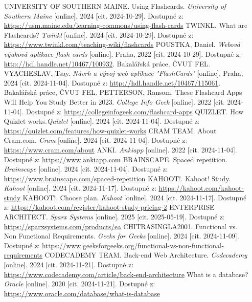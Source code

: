 \documentclass[twoside]{ctuthesis}
\begin{document}
\begin{thebibliography}{1}

UNIVERSITY OF SOUTHERN MAINE. Using Flashcards. \emph{University of Southern Maine} [online]. 2024 [cit. 2024-10-29]. Dostupné z: \url{https://usm.maine.edu/learning-commons/using-flash-cards}
TWINKL. What are Flashcards? \emph{Twinkl} [online]. 2024 [cit. 2024-10-29]. Dostupné z: \url{https://www.twinkl.com/teaching-wiki/flashcards}
POUSTKA, Daniel. \emph{Webová výuková aplikace flash cards} [online]. Praha, 2022 [cit. 2024-10-29]. Dostupné z: \url{http://hdl.handle.net/10467/100932}. Bakalářská práce, ČVUT FEL.
VYACHESLAV, Tsay. \emph{Návrh a vývoj web aplikace "FlashCards"} [online]. Praha, 2024 [cit. 2024-11-04]. Dostupné z: \url{http://hdl.handle.net/10467/115061}. Bakalářská práce, ČVUT FEL.
PETTERSON, Ransom. These Flashcard Apps Will Help You Study Better in 2023. \emph{College Info Geek} [online]. 2022 [cit. 2024-11-04]. Dostupné z: \url{https://collegeinfogeek.com/flashcard-apps}
QUIZLET. How Quizlet works.\emph{Quizlet} [online]. 2024 [cit. 2024-11-04]. Dostupné z: \url{https://quizlet.com/features/how-quizlet-works}
CRAM TEAM. About Cram.com. \emph{Cram} [online]. 2024 [cit. 2024-11-04]. Dostupné z: \url{https://www.cram.com/about}
ANKI. \emph{Ankiapp} [online]. 2022 [cit. 2024-11-04]. Dostupné z: \url{https://www.ankiapp.com}
BRAINSCAPE. Spaced repetition. \emph{Brainscape} [online]. 2024 [cit. 2024-11-04]. Dostupné z: \url{https://www.brainscape.com/spaced-repetition}
KAHOOT!. Kahoot! Study. \emph{Kahoot} [online]. 2024 [cit. 2024-11-17]. Dostupné z: \url{https://kahoot.com/kahoot-study}
KAHOOT!. Choose plan. \emph{Kahoot} [online]. 2024 [cit. 2024-11-17]. Dostupné z: \url{https://kahoot.com/register/kahoot-study-pricing-2}
ENTERPRISE ARCHITECT. \emph{Sparx Systems} [online]. 2025 [cit. 2025-05-19]. Dostupné z: \url{https://sparxsystems.com/products/ea}
CHITRASINGLA2001. Functional vs. Non Functional Requirements. \emph{Geeks for Geeks} [online]. 2024 [cit. 2024-11-09]. Dostupné z: \url{https://www.geeksforgeeks.org/functional-vs-non-functional-requirements}
CODECADEMY TEAM. Back-end Web Architecture. \emph{Codecademy} [online]. 2024 [cit. 2024-11-21]. Dostupné z: \url{https://www.codecademy.com/article/back-end-architecture}
What is a database? \emph{Oracle} [online]. 2020 [cit. 2024-11-21]. Dostupné z: \url{https://www.oracle.com/database/what-is-database}

\end{thebibliography}
\end{document}

